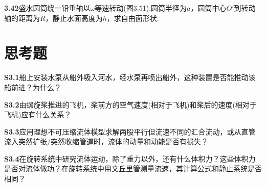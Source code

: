 \medskip
\noindent\textbf{3.42}\quad 盛水圆筒绕一铅垂轴以$\omega$等速转动(图3.51).圆筒半径为$a$，圆筒中心$O'$到转动轴的距离为$R$，静止水面高度为$h$，求自由面形状.

\section*{思考题}

\noindent\textbf{S3.1}\quad 船上安装水泵从船外吸入河水，经水泵再喷出船外，这种装置是否能推动该船前进？为什么？

\medskip
\noindent\textbf{S3.2}\quad 由螺旋桨推进的飞机，桨前方的空气速度(相对于飞机)和桨后的速度(相对于飞机)应有什么关系？

\medskip
\noindent\textbf{S3.3}\quad 应用理想不可压缩流体模型求解两股平行但流速不同的汇合流动，或从直管流入突然扩张/突然收缩管道时，流体的动量和动能是否有损失？

\medskip
\noindent\textbf{S3.4}\quad 在旋转系统中研究流体运动，除了重力以外，还有什么体积力？这些体积力是否对流体做功？在旋转系统中用文丘里管测量流速，其计算公式和静止系统是否相同？